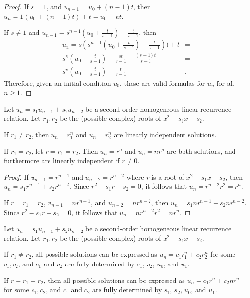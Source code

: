 \documentclass[12pt]{article}
\begin{document}
\begin{proof}\proofbreak
    If $s = 1$, and $u_{n-1} = u_0 + (n-1)t$, then $u_n = 1(u_0 + (n-1)t) + t = u_0 + nt$.

    If $s \neq 1$ and $u_{n-1} = s^{n-1}(u_0 + \frac{t}{s-1}) - \frac{t}{s-1}$, then
    \begin{align*}
        u_n = s(s^{n-1}(u_0 + \frac{t}{s-1}) - \frac{t}{s-1})) + t & = \\
        s^n(u_0 + \frac{t}{s-1}) - \frac{st}{s-1} + \frac{(s-1)t}{s-1} & = \\
        s^n(u_0 + \frac{t}{s-1}) - \frac{t}{s-1} &.
    \end{align*}
    Therefore, given an initial condition $u_0$, these are valid formulas for $u_n$ for all $n \geq 1$.
\end{proof}

\begin{thm}
    Let $u_n = s_1u_{n-1} + s_2u_{n-2}$ be a second-order homogeneous linear recurrence relation. Let $r_1, r_2$ be the (possible complex) roots of $x^2 - s_1x - s_2$.

    If $r_1 \neq r_2$, then $u_n = r_1^n$ and $u_n = r_2^n$ are linearly independent solutions.

    If $r_1 = r_2$, let $r = r_1 = r_2$. Then $u_n = r^n$ and $u_n = nr^n$ are both solutions, and furthermore are linearly independent if $r \neq 0$.
\end{thm}

\begin{proof}\proofbreak
    If $u_{n-1} = r^{n-1}$ and $u_{n-2} = r^{n-2}$ where $r$ is a root of $x^2 - s_1x - s_2$, then $u_n = s_1r^{n-1} + s_2r^{n-2}$. Since $r^2 - s_1r - s_2 = 0$, it follows that $u_n = r^{n-2}r^2 = r^n$.

    If $r = r_1 = r_2$, $u_{n-1} = nr^{n-1}$, and $u_{n-2} = nr^{n-2}$, then $u_n = s_1nr^{n-1} + s_2nr^{n-2}$. Since $r^2 - s_1r - s_2 = 0$, it follows that $u_n = nr^{n-2}r^2 = nr^n$.
\end{proof}

\begin{thm}
    Let $u_n = s_1u_{n-1} + s_2u_{n-2}$ be a second-order homogeneous linear recurrence relation. Let $r_1, r_2$ be the (possible complex) roots of $x^2 - s_1x - s_2$.

    If $r_1 \neq r_2$, all possible solutions can be expressed as $u_n = c_1r_1^n + c_2r_2^n$  for some $c_1, c_2$, and $c_1$ and $c_2$ are fully determined by $s_1$, $s_2$, $u_0$, and $u_1$.

    If $r = r_1 = r_2$, then all possible solutions can be expressed as $u_n = c_1r^n + c_2nr^n$ for some $c_1, c_2$, and $c_1$ and $c_2$ are fully determined by $s_1$, $s_2$, $u_0$, and $u_1$.
\end{thm}
\end{document}
